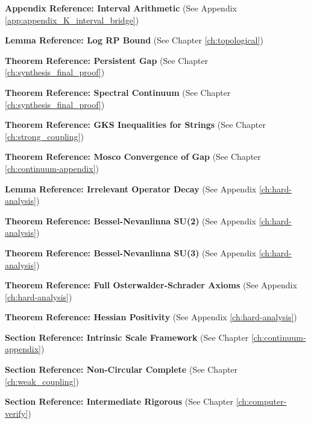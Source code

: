 \label{app:interval_arithmetic_ref}
\textbf{Appendix Reference: Interval Arithmetic} (See Appendix \ref{app:appendix_K_interval_bridge})

\label{lem:log-rp-bound}
\textbf{Lemma Reference: Log RP Bound} (See Chapter \ref{ch:topological})

\label{thm:persistent-gap}
\textbf{Theorem Reference: Persistent Gap} (See Chapter \ref{ch:synthesis_final_proof})

\label{thm:spectral-continuum}
\textbf{Theorem Reference: Spectral Continuum} (See Chapter \ref{ch:synthesis_final_proof})

\label{thm:gks-string}
\textbf{Theorem Reference: GKS Inequalities for Strings} (See Chapter \ref{ch:strong_coupling})

\label{thm:gap-e-mosco}
\textbf{Theorem Reference: Mosco Convergence of Gap} (See Chapter \ref{ch:continuum-appendix})

\label{lem:irrelevant_decay}
\textbf{Lemma Reference: Irrelevant Operator Decay} (See Appendix \ref{ch:hard-analysis})

\label{thm:bessel-su2}
\textbf{Theorem Reference: Bessel-Nevanlinna SU(2)} (See Appendix \ref{ch:hard-analysis})

\label{thm:bessel-su3}
\textbf{Theorem Reference: Bessel-Nevanlinna SU(3)} (See Appendix \ref{ch:hard-analysis})

\label{thm:full-os}
\textbf{Theorem Reference: Full Osterwalder-Schrader Axioms} (See Appendix \ref{ch:hard-analysis})

\label{thm:hessian_positivity}
\textbf{Theorem Reference: Hessian Positivity} (See Appendix \ref{ch:hard-analysis})

\label{sec:intrinsic-scale-framework}
\textbf{Section Reference: Intrinsic Scale Framework} (See Chapter \ref{ch:continuum-appendix})

\label{sec:non-circular-complete}
\textbf{Section Reference: Non-Circular Complete} (See Chapter \ref{ch:weak_coupling})

\label{sec:intermediate-rigorous}
\textbf{Section Reference: Intermediate Rigorous} (See Chapter \ref{ch:computer-verify})





